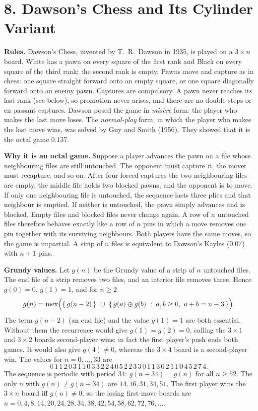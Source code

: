 
\section*{8. Dawson's Chess and Its Cylinder Variant}

\textbf{Rules.} Dawson's Chess, invented by T.~R.~Dawson in 1935, is played on a
$3\times n$ board. White has a pawn on every square of the first rank and Black on every
square of the third rank; the second rank is empty. Pawns move and capture as in chess: one
square straight forward onto an empty square, or one square diagonally forward onto an
enemy pawn. Captures are compulsory. A pawn never reaches its last rank (see below), so
promotion never arises, and there are no double steps or en passant captures.
Dawson posed the game in \emph{mis\`ere} form: the player who makes the last move loses.
The \emph{normal-play} form, in which the player who makes the last move wins, was solved
by Guy and Smith (1956). They showed that it is the octal game $\mathbf{0.137}$.

\textbf{Why it is an octal game.} Suppose a player advances the pawn on a file whose
neighbouring files are still untouched. The opponent must capture it, the mover must
recapture, and so on. After four forced captures the two neighbouring files are empty, the
middle file holds two blocked pawns, and the opponent is to move. If only one neighbouring
file is untouched, the sequence lasts three plies and that neighbour is emptied. If
neither is untouched, the pawn simply advances and is blocked. Empty files and blocked
files never change again. A row of $n$ untouched files therefore behaves exactly like a
row of $n$ pins in which a move removes one pin together with its surviving neighbours.
Both players have the same moves, so the game is impartial. A strip of $n$ files is
equivalent to Dawson's Kayles ($\mathbf{0.07}$) with $n+1$ pins.

\textbf{Grundy values.} Let $g(n)$ be the Grundy value of a strip of $n$ untouched files.
The end file of a strip removes two files, and an interior file removes three. Hence
$g(0)=0$, $g(1)=1$, and for $n\ge 2$
\[
g(n)=\operatorname{mex}\Bigl(\{\,g(n-2)\,\}\ \cup\ \{\,g(a)\oplus g(b)\;:\;a,b\ge 0,\ a+b=n-3\,\}\Bigr).
\]
The term $g(n-2)$ (an end file) and the value $g(1)=1$ are both essential. Without them
the recurrence would give $g(1)=g(2)=0$, calling the $3\times1$ and $3\times2$ boards
second-player wins; in fact the first player's push ends both games. It would also give
$g(4)\neq0$, whereas the $3\times4$ board is a second-player win. The values for
$n=0,\dots,33$ are
\[
0\,1\,1\,2\,0\,3\,1\,1\,0\,3\,3\,2\,2\,4\,0\,5\,2\,2\,3\,3\,0\,1\,1\,3\,0\,2\,1\,1\,0\,4\,5\,2\,7\,4 .
\]
The sequence is periodic with period $34$: $g(n+34)=g(n)$ for all $n\ge 52$. The only
$n$ with $g(n)\ne g(n+34)$ are $14, 16, 31, 34, 51$. The first player wins the $3\times n$
board iff $g(n)\neq 0$, so the losing first-move boards are
$n = 0,4,8,14,20,24,28,34,38,42,54,58,62,72,76,\dots$.

